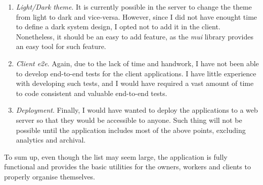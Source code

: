 \documentclass[a4paper, 12pt, oneside]{book}
\begin{document}
\begin{enumerate}[label = -]
	\item \emph{Light/Dark theme}. It is currently possible in the server to change the theme from light to dark and vice-versa. However, since I did not have enought time to define a dark system design, I opted not to add it in the client. Nonetheless, it should be an easy to add feature, as the \emph{mui} library provides an easy tool for such feature.
	\item \emph{Client e2e}. Again, due to the lack of time and handwork, I have not been able to develop end-to-end tests for the client applications. I have little experience with developing such tests, and I would have required a vast amount of time to code consistent and valuable end-to-end tests.
	\item \emph{Deployment}. Finally, I would have wanted to deploy the applications to a web server so that they would be accessible to anyone. Such thing will not be possible until the application includes most of the above points, excluding analytics and archival.
\end{enumerate}
To sum up, even though the list may seem large, the application is fully functional and provides the basic utilities for the owners, workers and clients to properly organise themselves.
\appendix
\end{document}
